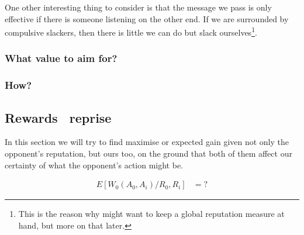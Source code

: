 \documentclass[10pt,fleqn]{article}
\begin{document}
One other interesting thing to consider is that the message we pass is only
effective if there is someone listening on the other end. If we are surrounded
by compulsive slackers, then there is little we can do but slack
ourselves\footnote{This is the reason why might want to keep a global reputation
measure at hand, but more on that later.}.


\subsubsection{What value to aim for?}

\subsubsection{How?}

\subsection{Rewards \dash\ reprise}

In this section we will try to find maximise or expected gain given not only the
opponent's reputation, but ours too, on the ground that both of them affect our
certainty of what the opponent's action might be.

\begin{align*}
  E[W_0(A_0, A_i) / R_0, R_i] &= ?
\end{align*}
\end{document}
